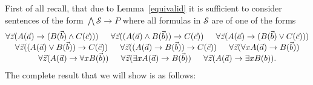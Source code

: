 \documentclass[a4paper,11pt]{report}
\theoremstyle{definition}
\theoremstyle{definition}
\theoremstyle{definition}
\theoremstyle{definition}
\theoremstyle{definition}
\theoremstyle{definition}
\theoremstyle{definition}
\begin{document}
	First of all recall, that due to Lemma~\ref{equivalid} it is sufficient to consider sentences of the form $\bigwedge\mathcal S\to P$ where all formulas in $\mathcal S$ are of one of the forms
	\[\begin{matrix}
		\forall \vec z(A(\vec a)\to (B(\vec b)\wedge C(\vec c)))\indent \forall \vec z((A(\vec a)\wedge B(\vec b))\to C(\vec c))\indent \forall \vec z(A(\vec a)\to (B(\vec b)\vee C(\vec c)))\\
		\forall \vec z((A(\vec a)\vee B(\vec b))\to C(\vec c))\indent \forall \vec z((A(\vec a)\to B(\vec b))\to C(\vec c))\indent\forall \vec z(\forall xA(\vec a)\to B(\vec b))\\ \forall \vec z(A(\vec a)\to\forall xB(\vec b))\indent \forall \vec z(\exists xA(\vec a)\to B(\vec b))\indent\forall \vec z(A(\vec a)\to\exists xB(b)).
	\end{matrix}\]
	The complete result that we will show is as follows:
\end{document}
